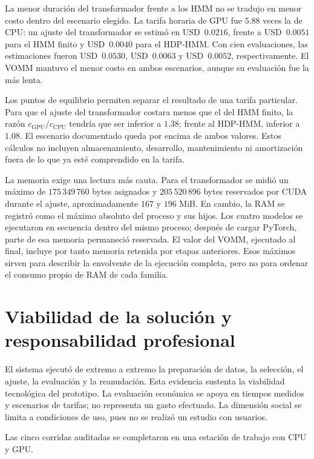 La menor duración del transformador frente a los HMM no se tradujo en menor costo dentro del escenario elegido. La tarifa horaria de GPU fue $5.88$ veces la de CPU: un ajuste del transformador se estimó en USD~$0.0216$, frente a USD~$0.0051$ para el HMM finito y USD~$0.0040$ para el HDP-HMM. Con cien evaluaciones, las estimaciones fueron USD~$0.0530$, USD~$0.0063$ y USD~$0.0052$, respectivamente. El VOMM mantuvo el menor costo en ambos escenarios, aunque su evaluación fue la más lenta.

Los puntos de equilibrio permiten separar el resultado de una tarifa particular. Para que el ajuste del transformador costara menos que el del HMM finito, la razón $c_{\mathrm{GPU}}/c_{\mathrm{CPU}}$ tendría que ser inferior a $1.38$; frente al HDP-HMM, inferior a $1.08$. El escenario documentado queda por encima de ambos valores. Estos cálculos no incluyen almacenamiento, desarrollo, mantenimiento ni amortización fuera de lo que ya esté comprendido en la tarifa.

La memoria exige una lectura más cauta. Para el transformador se midió un máximo de $175\,349\,760$ bytes asignados y $205\,520\,896$ bytes reservados por CUDA durante el ajuste, aproximadamente $167$ y $196$ MiB. En cambio, la RAM se registró como el máximo absoluto del proceso y sus hijos. Los cuatro modelos se ejecutaron en secuencia dentro del mismo proceso; después de cargar PyTorch, parte de esa memoria permaneció reservada. El valor del VOMM, ejecutado al final, incluye por tanto memoria retenida por etapas anteriores. Esos máximos sirven para describir la envolvente de la ejecución completa, pero no para ordenar el consumo propio de RAM de cada familia.

\section{Viabilidad de la solución y responsabilidad profesional}
\label{sec:chapter4-viabilidad}

El sistema ejecutó de extremo a extremo la preparación de datos, la selección, el ajuste, la evaluación y la reanudación. Esta evidencia sustenta la viabilidad tecnológica del prototipo. La evaluación económica se apoya en tiempos medidos y escenarios de tarifas; no representa un gasto efectuado. La dimensión social se limita a condiciones de uso, pues no se realizó un estudio con usuarios.

Las cinco corridas auditadas se completaron en una estación de trabajo con CPU y GPU.

